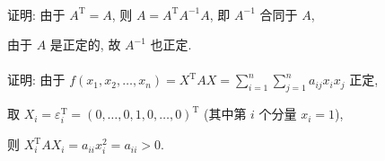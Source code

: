 	 \paragraph{} %
		 证明: 由于 \( A^{\mathrm{T}} = A \), 则 \( A = A^{\mathrm{T}}A^{-1}A \), 即 \( A^{-1} \) 合同于 \( A \),

		 由于 \( A \) 是正定的, 故 \( A^{-1} \) 也正定.


	 \paragraph{} %
		 证明: 由于 \( f(x_{1}, x_{2}, \dots, x_{n}) = X^{\mathrm{T}}AX = \sum_{i=1}^{n}\sum_{j=1}^{n}a_{ij}x_{i}x_{j} \) 正定,

		 取 \( X_{i} = \varepsilon_{i}^{\mathrm{T}} = (0, \dots, 0, 1, 0, \dots, 0)^{\mathrm{T}} \) (其中第 \( i \) 个分量 \( x_{i} = 1 \)),

		 则 \( X_{i}^{\mathrm{T}}AX_{i} = a_{ii}x_{i}^{2} = a_{ii} > 0 \).